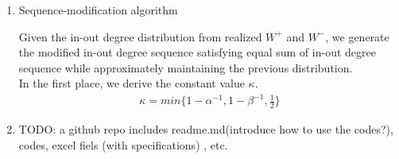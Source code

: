 \documentclass{article}
\begin{document}
\begin{enumerate}
\item \hypertarget{eaual_sum_algo}{Sequence-modification algorithm}
\par Given the in-out degree distribution from realized $W^{+}$ and $W^{-}$, we generate the modified in-out degree sequence satisfying equal sum of in-out degree sequence while approximately maintaining the previous distribution.\\
 In the first place, we derive the constant value $\kappa$. 
\begin{align*}
 \kappa = min\{ 1 - \alpha^{-1}, 1 - \beta^{-1}, \frac{1}{2} \}
 \end{align*}


\item TODO: a github repo includes readme.md(introduce how to use the codes?), codes, excel fiels (with specifications) , etc.

\end{enumerate}
\end{document}
